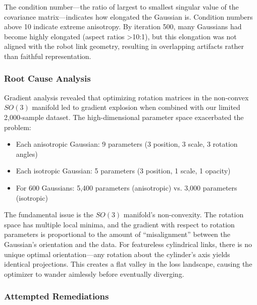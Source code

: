 \documentclass[12pt,a4paper,oneside]{report}
\begin{document}
The condition number---the ratio of largest to smallest singular value of the covariance matrix---indicates how elongated the Gaussian is. Condition numbers above 10 indicate extreme anisotropy. By iteration 500, many Gaussians had become highly elongated (aspect ratios >10:1), but this elongation was not aligned with the robot link geometry, resulting in overlapping artifacts rather than faithful representation.
\subsubsection{Root Cause Analysis}
\label{subsubsec:root_cause_analysis}

Gradient analysis revealed that optimizing rotation matrices in the non-convex $SO(3)$ manifold led to gradient explosion when combined with our limited 2,000-sample dataset. The high-dimensional parameter space exacerbated the problem:
\begin{itemize}
    \item Each anisotropic Gaussian: 9 parameters (3 position, 3 scale, 3 rotation angles)
    \item Each isotropic Gaussian: 5 parameters (3 position, 1 scale, 1 opacity)
    \item For 600 Gaussians: 5,400 parameters (anisotropic) vs. 3,000 parameters (isotropic)
\end{itemize}

The fundamental issue is the $SO(3)$ manifold's non-convexity. The rotation space has multiple local minima, and the gradient with respect to rotation parameters is proportional to the amount of ``misalignment'' between the Gaussian's orientation and the data. For featureless cylindrical links, there is no unique optimal orientation---any rotation about the cylinder's axis yields identical projections. This creates a flat valley in the loss landscape, causing the optimizer to wander aimlessly before eventually diverging.
\subsubsection{Attempted Remediations}
\label{subsubsec:attempted_remediations}
\end{document}
